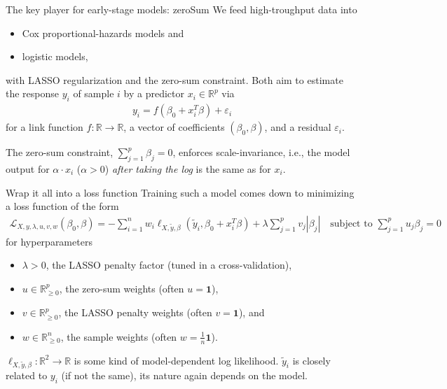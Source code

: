 \documentclass[10pt, aspectratio=169]{beamer}
\def\RR{\mathbb{R}}
\begin{document}
\begin{frame}{The key player for early-stage models: zeroSum}
  We feed high-troughput data into 

  \begin{itemize}
    \item \alert{Cox} proportional-hazards models and
    \item \alert{logistic} models,
  \end{itemize}

  with \alert{LASSO} regularization and the \alert{zero-sum} constraint. Both  
  aim to estimate the response $y_i$ of sample $i$ by a predictor $x_i \in \mathbb{R}^p$ via 
  \begin{align}
    y_i = f(\beta_0 + x_i^T \beta) + \varepsilon_i
  \end{align}
  for a link function $f: \mathbb{R} \to \mathbb{R}$, a vector of coefficients $(\beta_0, 
  \beta)$, and a residual $\varepsilon_i$.

  \pause
  The zero-sum constraint, $\sum_{j=1}^p \beta_j = 0$, enforces \alert{scale-invariance}, i.e., 
  the model output for $\alpha \cdot x_i$ ($\alpha > 0$) \textit{after taking the log} is the same 
  as for $x_i$.
\end{frame}

\begin{frame}{Wrap it all into a loss function}
  Training such a model comes down to minimizing a loss function of the form 
  \begin{align}
    \mathcal{L}_{X, y, \lambda, u, v, w}(\beta_0, \beta) = -\sum_{i=1}^n w_i 
    \ell_{X, \tilde{y}, \beta}(\tilde{y}_i, \beta_0 + x_i^T \beta) + \lambda \sum_{j=1}^p v_j |\beta_j| 
    \quad \text{subject to } \sum_{j=1}^p u_j \beta_j = 0
  \end{align}
  for hyperparameters 
  \begin{itemize}
    \item $\lambda > 0$, the LASSO penalty factor (tuned in a cross-validation),
    \item $u \in \RR^p_{\geq 0}$, the zero-sum weights (often $u = \mathbf{1}$),
    \item $v \in \RR^p_{\geq 0}$, the LASSO penalty weights (often $v = \mathbf{1}$), and
    \item $w \in \RR^n_{\geq 0}$, the sample weights (often $w = \frac{1}{n} \mathbf{1}$).
  \end{itemize}

  $\ell_{X, \tilde{y}, \beta}: \RR^2 \to \RR$ is some kind of model-dependent log likelihood. $\tilde{y}_i$ 
  is closely related to $y_i$ (if not the same), its nature again depends on the model.
\end{frame}
\end{document}

